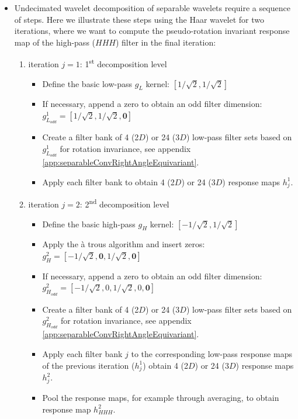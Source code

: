\documentclass[fleqn,a4paper,oneside,openany]{book}
\begin{document}
\begin{tcolorbox}[width=150mm, halign=left, colframe=black, colback=white, boxsep=0mm, arc=3mm, colframe=black!50!white,
title=Implementation Troubleshooting, title filled=true, fonttitle=\bfseries]
\begin{itemize}
\item Undecimated wavelet decomposition of separable wavelets require a sequence of steps. Here we illustrate these steps using the Haar wavelet for two iterations, where we want to compute the pseudo-rotation invariant response map of the high-pass ($HHH$) filter in the final iteration:
    \begin{enumerate}
        \item iteration $j=1$: 1\textsuperscript{st} decomposition level
            \begin{itemize}
                \item Define the basic low-pass $g_L$ kernel: $\left[1/\sqrt{2}, 1/\sqrt{2}\right]$
                \item If necessary, append a zero to obtain an odd filter dimension: $g^1_{L_{odd}}=\left[1/\sqrt{2}, 1/\sqrt{2}, \mathbf{0}\right]$
                \item Create a filter bank of 4 (2$D$) or 24 (3$D$) low-pass filter sets based on $g^1_{L_{odd}}$ for rotation invariance, see appendix \ref{app:separableConvRightAngleEquivariant}.
                \item Apply each filter bank to obtain 4 (2$D$) or 24 (3$D$) response maps $h^1_j$.
            \end{itemize}
        \item iteration $j=2$: 2\textsuperscript{nd} decomposition level
            \begin{itemize}
                \item Define the basic high-pass $g_H$ kernel: $\left[-1/\sqrt{2}, 1/\sqrt{2}\right]$
                \item Apply the à trous algorithm and insert zeros: $g^2_H=\left[-1/\sqrt{2}, \mathbf{0}, 1/\sqrt{2}, \mathbf{0} \right]$
                \item If necessary, append a zero to obtain an odd filter dimension: $g^2_{H_{odd}}=\left[-1/\sqrt{2}, 0, 1/\sqrt{2}, 0, \mathbf{0} \right]$
                \item Create a filter bank of 4 (2$D$) or 24 (3$D$) low-pass filter sets based on $g^2_{H_{odd}}$ for rotation invariance, see appendix \ref{app:separableConvRightAngleEquivariant}.
                \item Apply each filter bank $j$ to the corresponding low-pass response maps of the previous iteration ($h^1_j$) obtain 4 (2$D$) or 24 (3$D$) response maps $h^2_j$.
                \item Pool the response maps, for example through averaging, to obtain response map $h^2_{HHH}$.
            \end{itemize}
    \end{enumerate}
\end{itemize}
\end{tcolorbox}
\end{document}
